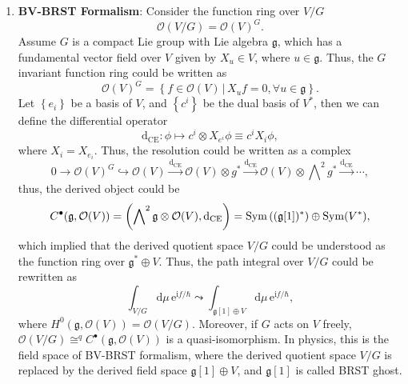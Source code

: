 \documentclass[10pt]{article}
\begin{document}
\begin{enumerate}[(1)]
  \item \textbf{BV-BRST Formalism}: Consider the function ring over $ V/G$
    \begin{equation*}
      \mathcal{O}(V/G) = \mathcal{O}(V)^{G}.
    \end{equation*}
    Assume $ G$ is a compact Lie group with Lie algebra $ \mathfrak{g}$, which has a fundamental vector field over $ V$ given by $ X_{u} \in V$, where $ u \in \mathfrak{g}$.
    Thus, the $ G$ invariant function ring could be written as
    \begin{equation*}
      \mathcal{O}(V)^{G} = \left\{ f \in \mathcal{O}(V) \, | \, X_{u} f = 0, \forall u \in \mathfrak{g} \right\}.
    \end{equation*}
    Let $\left\{ e_i \right\}$ be a basis of $ V$, and $\left\{ c^{i} \right\}$ be the dual basis of $ V^{*}$, then we can define the differential operator
    \begin{equation*}
      \mathrm{d} _{\mathrm{CE}} : \phi \mapsto c^{i} \otimes X_{e^{i}} \phi \equiv c^{i} X_{i} \phi,
    \end{equation*}
    where $ X_{i} = X_{e_i}$.
    Thus, the resolution could be written as a complex
    \begin{equation*}
      0 \rightarrow \mathcal{O}(V)^{G} \hookrightarrow \mathcal{O}(V) \xrightarrow{\mathrm{d} _{\mathrm{CE}}} \mathcal{O}(V) \otimes g^{*} \xrightarrow{\mathrm{d} _{\mathrm{CE}}} \mathcal{O}(V) \otimes \bigwedge\nolimits^{2} g^{*} \xrightarrow{\mathrm{d} _{\mathrm{CE}}} \cdots,
    \end{equation*}
    thus, the derived object could be
    \begin{equation*}
      C^{\bullet}(\mathfrak{g}, \mathcal{O}(V)) = \left( \bigwedge\nolimits^{2} \mathfrak{g} \otimes \mathcal{O}(V), \mathrm{d} _{\mathrm{CE}}\right) = \operatorname{Sym}\left( (\mathfrak{g}[1])^{*} \right) \oplus \operatorname{Sym}(V^{*}),
    \end{equation*}
    which implied that the derived quotient space $ V/G$ could be understood as the function ring over $ \mathfrak{g}^{*} \oplus V$.
    Thus, the path integral over $ V/G$ could be rewritten as
    \begin{equation*}
      \int _{V/G} \mathrm{d} \mu \, \mathrm{e}^{\mathrm{i} f / \hbar} \leadsto \int _{\mathfrak{g}[1] \oplus V} \mathrm{d} \mu \, \mathrm{e}^{\mathrm{i} f / \hbar},
    \end{equation*}
    where $ H^{0}(\mathfrak{g}, \mathcal{O}(V)) = \mathcal{O}(V / G)$. Moreover, if $ G$ acts on $ V$ freely, $ \mathcal{O}(V / G) \cong^{q} C^{\bullet}(\mathfrak{g}, \mathcal{O}(V))$ is a quasi-isomorphism.
    In physics, this is the field space of BV-BRST formalism, where the derived quotient space $ V/G$ is replaced by the derived field space $ \mathfrak{g}[1] \oplus V$, and $ \mathfrak{g}[1]$ is called BRST ghost.
\end{enumerate}
\end{document}
